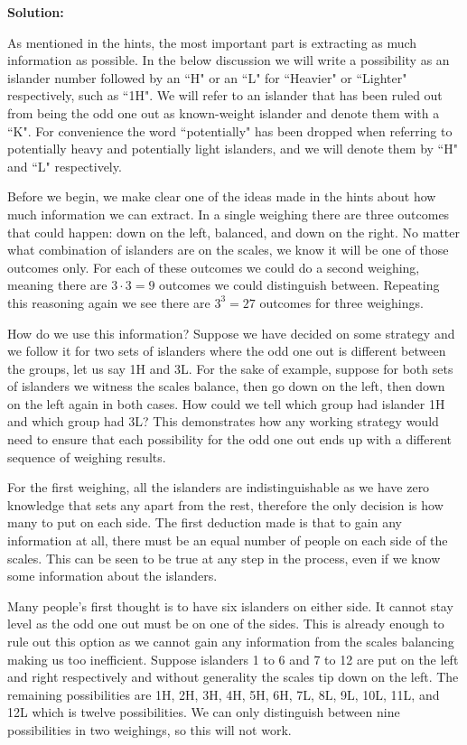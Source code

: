 \textbf{Solution:}

As mentioned in the hints, the most important part is extracting as much information as possible. In the below discussion we will write a possibility as an islander number followed by an ``H" or an ``L" for ``Heavier" or ``Lighter" respectively, such as ``1H". We will refer to an islander that has been ruled out from being the odd one out as known-weight islander and denote them with a ``K". For convenience the word ``potentially" has been dropped when referring to potentially heavy and potentially light islanders, and we will denote them by ``H" and ``L" respectively.

Before we begin, we make clear one of the ideas made in the hints about how much information we can extract. In a single weighing there are three outcomes that could happen: down on the left, balanced, and down on the right. No matter what combination of islanders are on the scales, we know it will be one of those outcomes only. For each of these outcomes we could do a second weighing, meaning there are $3 \cdot 3 = 9$ outcomes we could distinguish between. Repeating this reasoning again we see there are $3^3 = 27$ outcomes for three weighings.

How do we use this information? Suppose we have decided on some strategy and we follow it for two sets of islanders where the odd one out is different between the groups, let us say 1H and 3L. For the sake of example, suppose for both sets of islanders we witness the scales balance, then go down on the left, then down on the left again in both cases. How could we tell which group had islander 1H and which group had 3L? This demonstrates how any working strategy would need to ensure that each possibility for the odd one out ends up with a different sequence of weighing results.

For the first weighing, all the islanders are indistinguishable as we have zero knowledge that sets any apart from the rest, therefore the only decision is how many to put on each side. The first deduction made is that to gain any information at all, there must be an equal number of people on each side of the scales. This can be seen to be true at any step in the process, even if we know some information about the islanders.

Many people's first thought is to have six islanders on either side. It cannot stay level as the odd one out must be on one of the sides. This is already enough to rule out this option as we cannot gain any information from the scales balancing making us too inefficient. Suppose islanders 1 to 6 and 7 to 12 are put on the left and right respectively and without generality the scales tip down on the left. The remaining possibilities are 1H, 2H, 3H, 4H, 5H, 6H, 7L, 8L, 9L, 10L, 11L, and 12L which is twelve possibilities. We can only distinguish between nine possibilities in two weighings, so this will not work.

